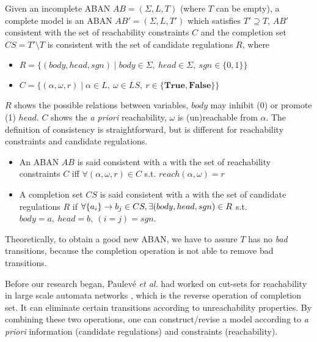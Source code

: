 \begin{definition}
    Given an incomplete ABAN $AB=(\Sigma, L, T)$ (where $T$ can be empty), a complete model is an ABAN $AB'=(\Sigma, L, T')$ which satisfies $T'\supseteq T$, $AB'$ consistent with the set of reachability constraints $C$ and the completion set $CS=T'\setminus T$ is consistent with the set of candidate regulations $R$, where
    \begin{itemize}
        \item $R=\{(body,head,sgn)\mid body\in \Sigma,\ head\in \Sigma,\ sgn\in \{0,1\}\}$ 
        \item $C=\{(\alpha,\omega,r)\mid\alpha \in L,\ \omega\in LS,\ r\in \{\mathbf{True,False}\}\}$
    \end{itemize}
\end{definition}

$R$ shows the possible relations between variables, $body$ may inhibit (0) or promote (1) $head$.
$C$ shows the \textit{a priori} reachability, $\omega$ is (un)reachable from $\alpha$.
The definition of consistency is straightforward, but is different for reachability constraints and candidate regulations.

\begin{definition}[Consistency]
\leavevmode
\makeatletter
\@nobreaktrue
\makeatother
\begin{itemize}
    \item An ABAN $AB$ is said consistent with a with the set of reachability constraints $C$ iff $\forall (\alpha,\omega,r)\in C$ s.t. $reach(\alpha,\omega)=r$
    \item A completion set $CS$ is said consistent with a with the set of candidate regulations $R$ if $\forall \acm{a_i}{b_{1-j}}{b_j}\in CS, \exists (body,head,sgn)\in R$ s.t. $body=a,\ head=b,\ (i=j)=sgn$. 
\end{itemize}
    
\end{definition}
Theoretically, to obtain a good new ABAN, we have to assure $T$ has no \textit{bad} transitions, because the completion operation is not able to remove bad transitions. 

Before our research began, Paulev\'e \textit{et al.} had worked on cut-sets for reachability in large scale automata networks \cite{PAK13-CAV}, which is the reverse operation of completion set.
It can eliminate certain transitions according to unreachability properties.
By combining these two operations, one can construct/revise a model according to \textit{a priori} information (candidate regulations) and constraints (reachability).

